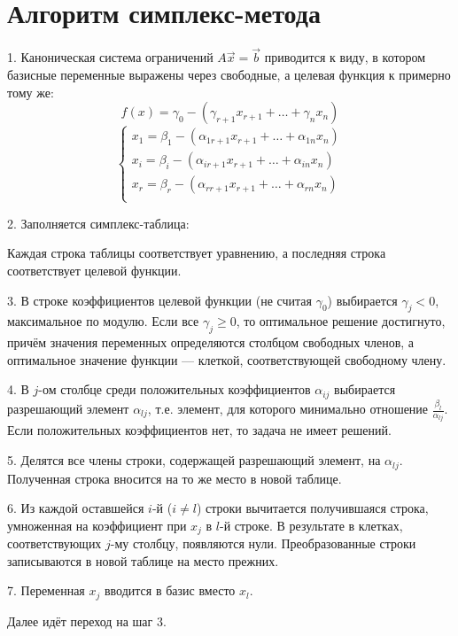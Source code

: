 \documentclass[17pt]{extarticle}
\begin{document}
\section{Алгоритм симплекс-метода}

1. Каноническая система ограничений \( A\vec{x} = \vec{b} \) приводится к виду, в котором базисные переменные выражены через свободные, а целевая функция к примерно тому же:
\[
    f(x) = \gamma_0 - (\gamma_{r+1}x_{r+1} + \dots + \gamma_n x_n)
\]
\[
    \begin{cases}
        x_1 = \beta_1 - (\alpha_{1 r+1}x_{r+1} + \dots + \alpha_{1n}x_n) \\
        x_i = \beta_i - (\alpha_{i r+1}x_{r+1} + \dots + \alpha_{in}x_n) \\
        x_r = \beta_r - (\alpha_{r r+1}x_{r+1} + \dots + \alpha_{rn}x_n) \\
    \end{cases}
\]

2. Заполняется симплекс-таблица:


Каждая строка таблицы соответствует уравнению, а последняя строка соответствует целевой функции.

3. В строке коэффициентов целевой функции (не считая \( \gamma_0 \)) выбирается \( \gamma_j < 0 \), максимальное по модулю.
Если все \( \gamma_j \ge 0 \), то оптимальное решение достигнуто, причём значения переменных определяются столбцом свободных членов, а оптимальное значение функции — клеткой, соответствующей свободному члену.

4. В \( j \)-ом столбце среди положительных коэффициентов \( \alpha_{ij} \) выбирается разрешающий элемент \( \alpha_{lj} \), т.е. элемент, для которого минимально отношение \( \frac{\beta_l}{\alpha_{lj}} \). Если положительных коэффициентов нет, то задача не имеет решений.

5. Делятся все члены строки, содержащей разрешающий элемент, на \( \alpha_{lj} \). Полученная строка вносится на то же место в новой таблице.

6. Из каждой оставшейся \( i \)-й (\( i \ne l \)) строки вычитается получившаяся строка, умноженная на коэффициент при \( x_j \) в \( l \)-й строке. В результате в клетках, соответствующих \( j \)-му столбцу, появляются нули. Преобразованные строки записываются в новой таблице на место прежних.

7. Переменная \( x_j \) вводится в базис вместо \( x_l \).

Далее идёт переход на шаг 3.
\end{document}
